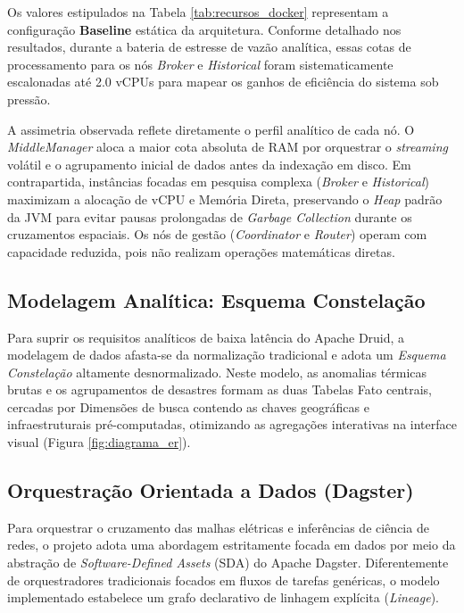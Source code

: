 Os valores estipulados na Tabela \ref{tab:recursos_docker} representam a configuração \textbf{Baseline} estática da arquitetura. Conforme detalhado nos resultados, durante a bateria de estresse de vazão analítica, essas cotas de processamento para os nós \textit{Broker} e \textit{Historical} foram sistematicamente escalonadas até 2.0 vCPUs para mapear os ganhos de eficiência do sistema sob pressão.

A assimetria observada reflete diretamente o perfil analítico de cada nó. O \textit{MiddleManager} aloca a maior cota absoluta de RAM por orquestrar o \textit{streaming} volátil e o agrupamento inicial de dados antes da indexação em disco. Em contrapartida, instâncias focadas em pesquisa complexa (\textit{Broker} e \textit{Historical}) maximizam a alocação de vCPU e Memória Direta, preservando o \textit{Heap} padrão da JVM para evitar pausas prolongadas de \textit{Garbage Collection} durante os cruzamentos espaciais. Os nós de gestão (\textit{Coordinator} e \textit{Router}) operam com capacidade reduzida, pois não realizam operações matemáticas diretas.

\subsection{Modelagem Analítica: Esquema Constelação}

Para suprir os requisitos analíticos de baixa latência do Apache Druid, a modelagem de dados afasta-se da normalização tradicional e adota um \textit{Esquema Constelação} altamente desnormalizado. Neste modelo, as anomalias térmicas brutas e os agrupamentos de desastres formam as duas Tabelas Fato centrais, cercadas por Dimensões de busca contendo as chaves geográficas e infraestruturais pré-computadas, otimizando as agregações interativas na interface visual (Figura \ref{fig:diagrama_er}).



\subsection{Orquestração Orientada a Dados (Dagster)}

Para orquestrar o cruzamento das malhas elétricas e inferências de ciência de redes, o projeto adota uma abordagem estritamente focada em dados por meio da abstração de \textit{Software-Defined Assets} (SDA) do Apache Dagster. Diferentemente de orquestradores tradicionais focados em fluxos de tarefas genéricas, o modelo implementado estabelece um grafo declarativo de linhagem explícita (\textit{Lineage}). 

